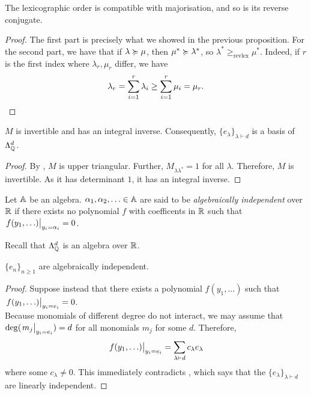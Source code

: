 	\begin{corollary}
		The lexicographic order is compatible with majorisation, and so is its reverse conjugate.
	\end{corollary}
	\begin{proof}
		The first part is precisely what we showed in the previous proposition. For the second part, we have that if $\lambda \succcurlyeq \mu$, then $\mu^* \succcurlyeq \lambda^*$, so $\lambda^* \ge_{\text{revlex}} \mu^*$. Indeed, if $r$ is the first index where $\lambda_r,\mu_r$ differ, we have
		\[ \lambda_r = \sum_{i=1}^r \lambda_i \ge \sum_{i=1}^r \mu_i = \mu_r. \qedhere \]
	\end{proof}

	\begin{fcor}
		\label{theo: eL form basis}
		$M$ is invertible and has an integral inverse. Consequently, $\{e_\lambda\}_{\lambda \vdash d}$ is a basis of $\Lambda_{\mathbb{Q}}^d$.
	\end{fcor}
	\begin{proof}
		By , $M$ is upper triangular. Further, $M_{\lambda\lambda^*} = 1$ for all $\lambda$. Therefore, $M$ is invertible. As it has determinant $1$, it has an integral inverse.
	\end{proof}

	\begin{fdef}
		Let $\mathbb{A}$ be an algebra. $\alpha_1,\alpha_2,\ldots\in \mathbb{A}$ are said to be \emph{algebraically independent} over $\mathbb{R}$ if there exists no polynomial $f$ with coefficents in $\mathbb{R}$ such that $\left.f(y_1,\ldots)\right|_{y_i = \alpha_i} = 0$.
	\end{fdef}

	Recall that $\Lambda_{\mathbb{Q}}^d$ is an algebra over $\mathbb{R}$.

	\begin{fcor}
		\label{cor: en algebraic indep}
		$\{e_n\}_{n \ge 1}$ are algebraically independent.
	\end{fcor}
	\begin{proof}
		Suppose instead that there exists a polynomial $f(y_1,\ldots)$ such that $\left.f(y_1,\ldots)\right|_{y_i = e_i} = 0$.\\
		Because monomials of different degree do not interact, we may assume that $\deg(\left.m_j\right|_{y_i = e_i}) = d$ for all monomials $m_j$ for some $d$. Therefore,
		\[ \left.f(y_1,\ldots)\right|_{y_i = e_i} = \sum_{\lambda \vdash d} c_\lambda e_\lambda \]
		where some $c_\lambda \ne 0$. This immediately contradicts , which says that the $\{e_\lambda\}_{\lambda \vdash d}$ are linearly independent.
	\end{proof}

